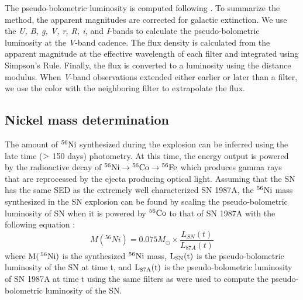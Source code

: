 \documentclass[a4paper,fleqn,usenatbib]{mnras}
\begin{document}
\indent The pseudo-bolometric luminosity is computed following \citet{2008valenti}.
To summarize the method, the apparent magnitudes are corrected for galactic extinction.
We use  the {\it U, B, g, V, r, R, i,} and {\it I}-bands to calculate the pseudo-bolometric luminosity at the {\it V}-band cadence.
The flux density is calculated from the apparent magnitude at the effective wavelength of each filter and integrated using Simpson's Rule. 
Finally, the flux is converted to a luminosity using the distance modulus. 
When {\it V}-band observations extended either earlier or later than a filter, we use the color with the neighboring filter to extrapolate the flux.
\subsection{Nickel mass determination}\label{Sec:Ni}
The amount of  $\rm{{}^{56}Ni}$ synthesized during the explosion can be inferred using the late time ($\rm{>}$ 150 days) photometry.
At this time, the energy output is powered by the radioactive decay of $\rm{{}^{56}Ni \rightarrow {}^{56}Co \rightarrow {}^{56}Fe}$ which produces gamma rays that are reprocessed by the ejecta producing optical light.
Assuming that the SN has the same SED as the extremely well characterized SN 1987A, the $\rm{{}^{56}Ni}$ mass synthesized in the SN explosion can be found by scaling the pseudo-bolometric luminosity of SN when it is powered by $\rm{{}^{56}Co}$ to that of SN 1987A with the following equation \citep{2014spiro}:
\begin{equation} \label{eqn:Ni}
M({}^{56}Ni) = 0.075M_{\odot} \times \frac{L_{SN}(t)}{L_{87A}(t)}
\end{equation}
where $\rm{M(\,{}^{56}Ni)}$ is the synthesized $\rm{{}^{56}Ni}$ mass, $\rm{L_{SN}(t)}$ is the pseudo-bolometric luminosity of the SN at time t, and $\rm{L_{87A}(t)}$ is the pseudo-bolometric luminosity of SN 1987A at time t using the same filters as were used to compute the pseudo-bolometric luminosity of the SN.
\end{document}
